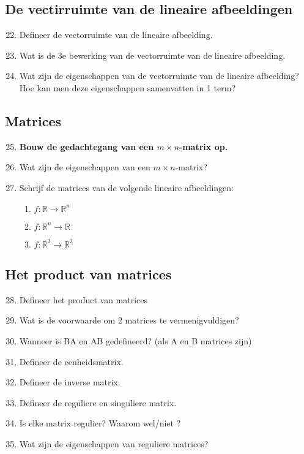 \documentclass[12pt]{article}
\begin{document}
    \subsection{De vectirruimte van de lineaire afbeeldingen}
    \begin{enumerate}
        \setcounter{enumi}{21}
        \item Defineer de vectorruimte van de lineaire afbeelding.
        \item Wat is de 3e bewerking van de vectorruimte van de lineaire afbeelding.
        \item Wat zijn de eigenschappen van de vectorruimte van de lineaire afbeelding? Hoe kan men deze eigenschappen samenvatten in 1 term?
    \end{enumerate}
    \subsection{Matrices}
    \begin{enumerate}
        \setcounter{enumi}{24}
        \item \textbf{Bouw de gedachtegang van een $m \times n$-matrix op.}
        \item Wat zijn de eigenschappen van een $m \times n$-matrix?
        \item Schrijf de matrices van de volgende lineaire afbeeldingen: \begin{enumerate}
            \item $f: \mathbb{R} \rightarrow \mathbb{R}^n$
            \item $f: \mathbb{R}^n \rightarrow \mathbb{R}$
            \item $f: \mathbb{R}^2 \rightarrow \mathbb{R}^2$
        \end{enumerate}
    \end{enumerate}
    \subsection{Het product van matrices}
    \begin{enumerate}
        \setcounter{enumi}{27}
        \item Defineer het product van matrices
        \item Wat is de voorwaarde om 2 matrices te vermenigvuldigen?
        \item Wanneer is BA en AB gedefineerd? (als A en B matrices zijn)
        \item Defineer de eenheidsmatrix.
        \item Defineer de inverse matrix.
        \item Defineer de reguliere en singuliere matrix.
        \item Is elke matrix regulier? Waarom wel/niet ?
        \item Wat zijn de eigenschappen van reguliere matrices?
    \end{enumerate}
\end{document}
